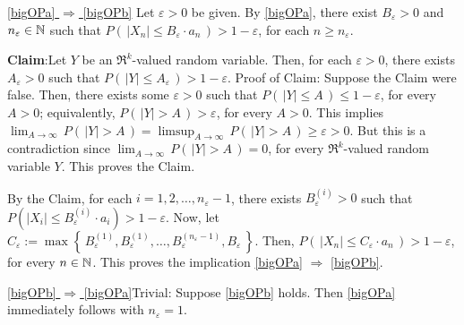 \proof

\vskip 0.3cm
\noindent
\underline{\eqref{bigOPa} $\Longrightarrow$ \eqref{bigOPb}}\vskip 0.2cm
\noindent
Let $\varepsilon > 0$ be given. By \eqref{bigOPa}, there exist $B_{\varepsilon} > 0$ and $n_{\varepsilon} \in \mathbb{N}$
such that $P\!\left(\,|X_{n}| \leq B_{\varepsilon}\cdot a_{n}\,\right) > 1 - \varepsilon$, for each $n \geq n_{\varepsilon}$.

\begin{center}
\begin{minipage}{6in}
\noindent
\textbf{Claim}:\quad Let $Y$ be an $\Re^{k}$-valued random variable.
Then, for each $\varepsilon > 0$, there exists $A_{\varepsilon} > 0$ such that $P\!\left(\,|Y| \leq A_{\varepsilon}\,\right) > 1 - \varepsilon$.
\vskip 0.2cm
\noindent
Proof of Claim: Suppose the Claim were false. Then, there exists some $\varepsilon > 0$
such that $P\!\left(\,|Y| \leq A\,\right) \leq 1 - \varepsilon$, for every $A > 0$;
equivalently, $P\!\left(\,|Y| > A\,\right) > \varepsilon$, for every $A > 0$.
This implies
$\lim_{A\rightarrow\infty}\,P\!\left(\,|Y| > A\,\right) = \limsup_{A\rightarrow\infty}\,P\!\left(\,|Y| > A\,\right) \geq \varepsilon > 0$.
But this is a contradiction since $\lim_{A\rightarrow\infty}\,P\!\left(\,|Y| > A\,\right) = 0$, for every $\Re^{k}$-valued random variable $Y$.
This proves the Claim.
\end{minipage}
\end{center}

\noindent
By the Claim, for each $i = 1, 2, \ldots, n_{\varepsilon} - 1$, there exists $B^{(i)}_{\varepsilon} > 0$ such that
$P\!\left(|X_{i}| \leq B^{(i)}_{\varepsilon}\cdot a_{i}\right) > 1 - \varepsilon$.
Now, let
$C_{\varepsilon} := \max\left\{\,B^{(1)}_{\varepsilon},B^{(1)}_{\varepsilon},\ldots,B^{(n_{\varepsilon}-1)}_{\varepsilon},B_{\varepsilon}\,\right\}$.
Then, $P\!\left(\,|X_{n}| \leq C_{\varepsilon}\cdot a_{n}\,\right) > 1 - \varepsilon$, for every $n \in \mathbb{N}$.
This proves the implication \eqref{bigOPa} $\Longrightarrow$ \eqref{bigOPb}.

\vskip 0.3cm
\noindent
\underline{\eqref{bigOPb} $\Longrightarrow$ \eqref{bigOPa}}\quad Trivial:
Suppose \eqref{bigOPb} holds. Then \eqref{bigOPa} immediately follows with $n_{\varepsilon} = 1$.

